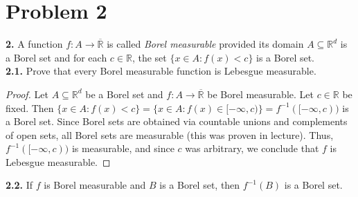 \section*{Problem 2}
\noindent \textbf{2.} A function \( f : A \to \overline{\mathbb{R}} \) is called \emph{Borel measurable} provided its domain \( A \subseteq \mathbb{R}^{d}  \) is a Borel set and for each \( c \in \mathbb{R} \), the set \( \{ x \in A : f(x) < c \}  \) is a Borel set. \\

\noindent \textbf{2.1.} Prove that every Borel measurable function is Lebesgue measurable.
\begin{proof}
	Let \( A \subseteq \mathbb{R}^{d}  \) be a Borel set and \( f : A \to \overline{\mathbb{R}} \) be Borel measurable. Let \( c \in \mathbb{R} \) be fixed. Then \( \{ x \in A : f(x) < c\} = \{ x \in A : f(x) \in [-\infty, c) \} =  f^{-1}([-\infty, c))   \) is a Borel set. Since Borel sets are obtained via countable unions and complements of open sets, all Borel sets are measurable (this was proven in lecture). Thus, \( f^{-1}([-\infty, c))  \) is measurable, and since \( c \) was arbitrary, we conclude that \( f \) is Lebesgue measurable.
\end{proof}
\noindent \textbf{2.2.} If \( f \) is Borel measurable and \( B \) is a Borel set, then \( f^{-1}(B) \) is a Borel set.
